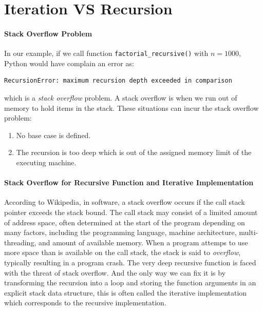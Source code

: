\documentclass[../main.tex]{subfiles}
\begin{document}

\section{Iteration VS Recursion}

\paragraph{Stack Overflow Problem} 
In our example, if we call function \texttt{factorial\_recursive()} with $n=1000$, Python would have complain an error as:
\begin{lstlisting}
RecursionError: maximum recursion depth exceeded in comparison
\end{lstlisting}
which is a \textit{stack overflow} problem.
A stack overflow is when we run out of memory to hold items in the stack. These situations can incur the stack overflow problem:
\begin{enumerate}
    \item No base case is defined. 
    \item The recursion is too deep which is out of the assigned memory limit of the executing machine. 
\end{enumerate}
\paragraph{Stack Overflow for Recursive Function and Iterative Implementation} According to Wikipedia, in software, a stack overflow occurs if the call stack pointer exceeds the stack bound. The call stack may consist of a limited amount of address space, often determined at the start of the program depending on many factors, including the programming language, machine architecture, multi-threading, and amount of available memory. When a program attemps to use more space than is available on the call stack, the stack is said to \textit{overflow}, typically resulting in a program crash. The very deep recursive function is faced with the threat of stack overflow. And the only way we can fix it is by transforming the recursion into a loop and storing the function arguments in an explicit stack data structure, this is often called the iterative implementation which corresponds to the recursive implementation. 
\end{document}
